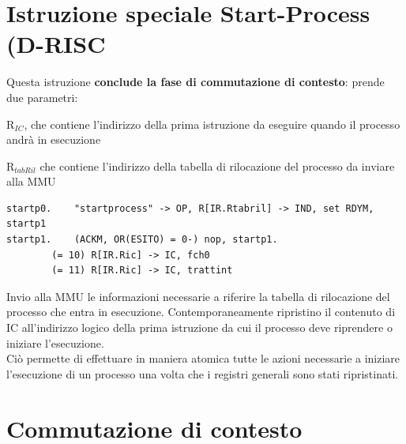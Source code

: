 \documentclass[10pt]{report}
\begin{document}
\section{Istruzione speciale Start-Process (D-RISC}
Questa istruzione \textbf{conclude la fase di commutazione di contesto}: prende due parametri:
\begin{list}{}{}
	\item R$_{IC}$, che contiene l'indirizzo della prima istruzione da eseguire quando il processo andrà in esecuzione
	\item R$_{tabRil}$ che contiene l'indirizzo della tabella di rilocazione del processo da inviare alla MMU
\end{list}
\begin{lstlisting}
startp0.	"startprocess" -> OP, R[IR.Rtabril] -> IND, set RDYM, startp1
startp1.	(ACKM, OR(ESITO) = 0-) nop, startp1.
		(= 10) R[IR.Ric] -> IC, fch0
		(= 11) R[IR.Ric] -> IC, trattint
\end{lstlisting}
Invio alla MMU le informazioni necessarie a riferire la tabella di rilocazione del processo che entra in esecuzione. Contemporaneamente ripristino il contenuto di IC all'indirizzo logico della prima istruzione da cui il processo deve riprendere o iniziare l'esecuzione.\\
Ciò permette di effettuare in maniera atomica tutte le azioni necessarie a iniziare l'esecuzione di un processo una volta che i registri generali sono stati ripristinati.
\section{Commutazione di contesto}
\end{document}
